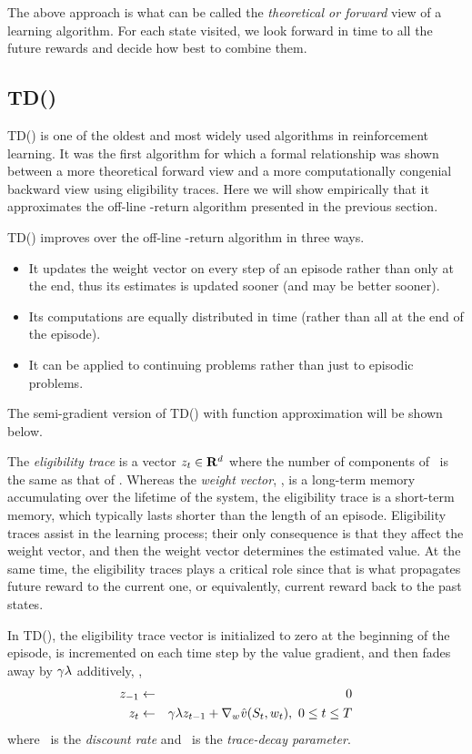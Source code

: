 The above approach is what can be called the \emph{theoretical or forward} view of a learning algorithm.
For each state visited, we look forward in time to all the future rewards and decide how best to combine them.

\subsection{TD(\tdparam)}

TD(\tdparam) is one of the oldest and most widely used algorithms in reinforcement learning.
It was the first algorithm for which a formal relationship was shown between a more theoretical forward view
and a more computationally congenial backward view using eligibility traces.
Here we will show empirically that it approximates the off-line \tdparam-return algorithm
presented in the previous section.

TD(\tdparam) improves over the off-line \tdparam-return algorithm in three ways.
\begin{itemize}
\item It updates the weight vector on every step of an episode rather than only at the end,
thus its estimates is updated sooner (and may be better sooner).
\item Its computations are equally distributed in time
(rather than all at the end of the episode).
\item It can be applied to continuing problems rather than just to episodic problems.
\end{itemize}
The semi-gradient version of TD(\tdparam) with function approximation
will be shown below.

The \emph{eligibility trace} is a vector $z_{t} \in \mathbf{R}^d$
where the number of components of \ is the same as that of .
Whereas the \emph{weight vector}, , is a long-term memory
accumulating over the lifetime of the system,
the eligibility trace is a short-term memory,
which typically lasts shorter than the length of an episode.
Eligibility traces assist in the learning process;
their only consequence is that they affect the weight vector,
and then the weight vector determines the estimated value.
At the same time, the eligibility traces plays a critical role
since that is what propagates future reward to the current one,
or equivalently, current reward back to the past states.

In TD(\tdparam),
the eligibility trace vector is initialized to zero at the beginning of the episode,
is incremented on each time step by the value gradient,
and then fades away by $\gamma \lambda$
additively,
\ie,
\begin{eqnarray}
\nonumber
z_{-1} &\leftarrow& 0
\\
z_{t} &\leftarrow& \gamma \lambda z_{t-1} + \nabla_{{w_{}}} \hat{v}(S_{t}, {w_{t}}),
\ 0 \leq t \leq T
\label{eq:et:et-update}
\end{eqnarray}
where \df\ is the \emph{discount rate} and \tdparam\ is the \emph{trace-decay parameter}.

